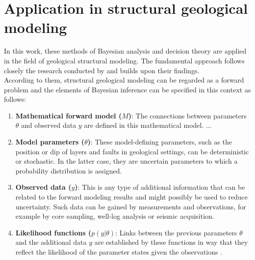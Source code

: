         \section{Application in structural geological modeling}
        In this work, these methods of Bayesian analysis and decision theory are applied in the field of geological structural modeling. The fundamental approach follows closely the research conducted by \citet{delaVarga2016} and builds upon their findings.\\
        According to them, structural geological modeling can be regarded as a forward problem and the elements of Bayesian inference can be specified in this context as follows:
        \begin{enumerate}
        	\item \textbf{Mathematical forward model ($M$)}: The connections between parameters $\theta$ and observed data $y$ are defined in this mathematical model. ...
        	\item \textbf{Model parameters ($\theta$)}: These model-defining parameters, such as the position or dip of layers and faults in geological settings, can be deterministic or stochastic. In the latter case, they are uncertain parameters to which a probability distribution is assigned.
        	\item \textbf{Observed data ($y$)}: This is any type of additional information that can be related to the forward modeling results and might possibly be used to reduce uncertainty. Such data can be gained by measurements and observations, for example by core sampling, well-log analysis or seismic acquisition. 
        	\item \textbf{Likelihood functions ($p(y|\theta)$}: Links between the previous parameters $\theta$ and the additional data $y$ are established by these functions in way that they reflect the likelihood of the parameter states given the observations \citep{delaVarga2016}.
        \end{enumerate}
        
